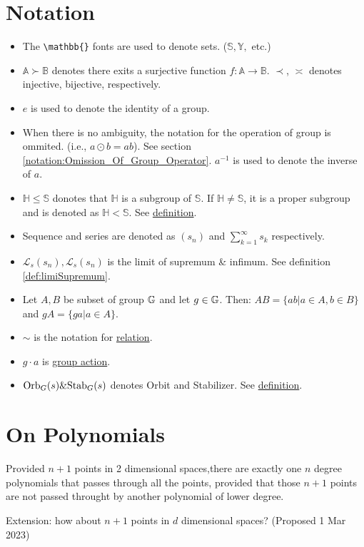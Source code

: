 \documentclass[../note.tex]{subfiles}
\begin{document}
\renewcommand{\thechapter}{\Roman{chapter}}
\chapter{Notation}
\begin{itemize}
	\item The \verb|\mathbb{}| fonts are used to denote sets. ($\mathbb{S}, \mathbb{Y},$ etc.)
	\item $\mathbb{A} \succ \mathbb{B}$ denotes there exits a surjective function $f:\mathbb{A}\rightarrow \mathbb{B}$. $\prec$, $\asymp$ denotes injective, bijective, respectively.
	\item $e$ is used to denote the identity of a group.
	\item When there is no ambiguity, the notation for the operation of group is ommited. (i.e., $a \odot b = ab$). See section \ref{notation:Omission_Of_Group_Operator}.
		$a^{-1}$ is used to denote the inverse of $a$.
	\item $\mathbb{H}\leq \mathbb{S}$ donotes that $\mathbb{H}$ is a subgroup of $\mathbb{S}$. If $\mathbb{H}\neq \mathbb{S}$, it is a proper subgroup and is denoted as $\mathbb{H}<\mathbb{S}$. See \hyperlink{def:subgroup}{definition}.
	\item Sequence and series are denoted as $(s_n)$ and $\sum^{\infty}_{k=1}s_k$ respectively.
	\item $\mathcal{L}_s(s_n), \mathcal{L}_s(s_n)$ is the limit of supremum \& infimum. See definition \ref{def:limiSupremum}.
	\item Let $A, B$ be subset of group $\mathbb{G}$ and let $g \in \mathbb{G}$. Then: $AB = \{ab|a\in A, b\in B\}$ and $gA = \{ga|a\in A\}$. 
	\item $\sim$ is the notation for \hyperlink{def:relation}{relation}.
	\item $g\cdot a$ is \hyperlink{def:group_action}{group action}. 
	\item $\text{Orb}_{G}({s}) \& \text{Stab}_{G}({s})$ denotes Orbit and Stabilizer. See \hyperlink{def:orbit_stabilizer}{definition}.
\end{itemize}

\chapter{On Polynomials}
\label{appendix:hypotheises}
\begin{hypothesis}
	Provided $n+1$ points in 2 dimensional spaces,there are exactly one $n$ degree polynomials that passes through all the points, provided that those $n+1$ points are not passed throught by another polynomial of lower degree.

	Extension: how about $n+1$ points in $d$ dimensional spaces? (Proposed 1 Mar 2023)
\end{hypothesis}
\end{document}
